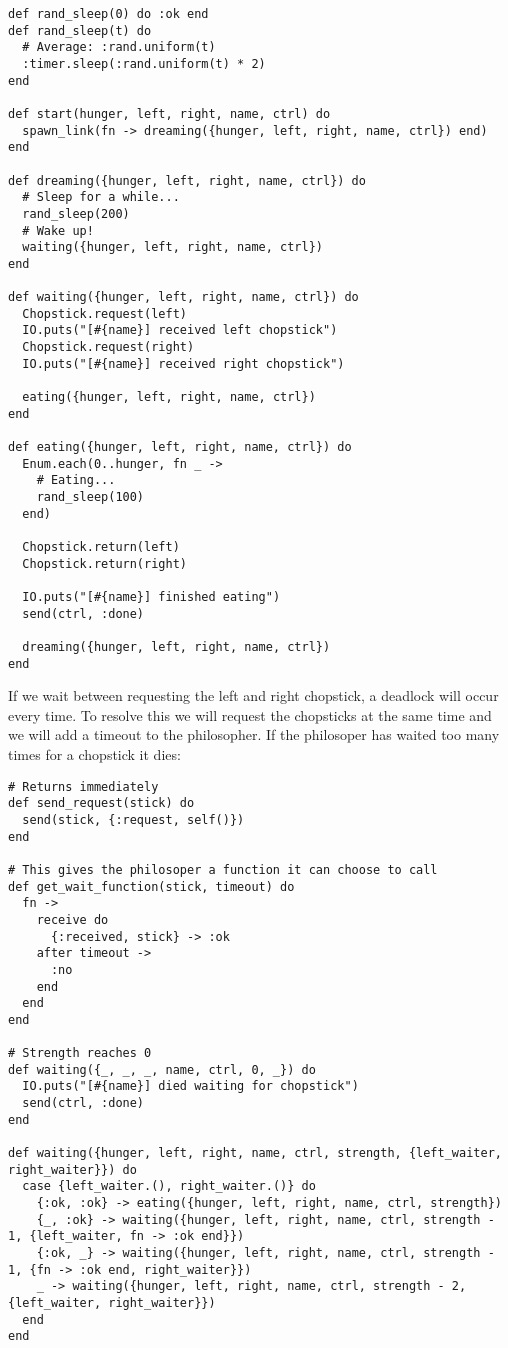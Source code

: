 \documentclass[a4paper,11pt]{article}
\begin{document}
\begin{verbatim}
def rand_sleep(0) do :ok end
def rand_sleep(t) do
  # Average: :rand.uniform(t)
  :timer.sleep(:rand.uniform(t) * 2)
end

def start(hunger, left, right, name, ctrl) do
  spawn_link(fn -> dreaming({hunger, left, right, name, ctrl}) end)
end

def dreaming({hunger, left, right, name, ctrl}) do
  # Sleep for a while...
  rand_sleep(200)
  # Wake up!
  waiting({hunger, left, right, name, ctrl})
end

def waiting({hunger, left, right, name, ctrl}) do
  Chopstick.request(left)
  IO.puts("[#{name}] received left chopstick")
  Chopstick.request(right)
  IO.puts("[#{name}] received right chopstick")

  eating({hunger, left, right, name, ctrl})
end

def eating({hunger, left, right, name, ctrl}) do
  Enum.each(0..hunger, fn _ ->
    # Eating...
    rand_sleep(100)
  end)

  Chopstick.return(left)
  Chopstick.return(right)

  IO.puts("[#{name}] finished eating")
  send(ctrl, :done)

  dreaming({hunger, left, right, name, ctrl})
end
\end{verbatim}

If we wait between requesting the left and right chopstick, a deadlock will occur every time.
To resolve this we will request the chopsticks at the same time and we will add a timeout to the philosopher. If the philosoper has waited too many times for a chopstick it dies:

\begin{verbatim}
# Returns immediately
def send_request(stick) do
  send(stick, {:request, self()})
end

# This gives the philosoper a function it can choose to call
def get_wait_function(stick, timeout) do
  fn ->
    receive do
      {:received, stick} -> :ok
    after timeout ->
      :no
    end
  end
end

# Strength reaches 0
def waiting({_, _, _, name, ctrl, 0, _}) do
  IO.puts("[#{name}] died waiting for chopstick")
  send(ctrl, :done)
end

def waiting({hunger, left, right, name, ctrl, strength, {left_waiter, right_waiter}}) do
  case {left_waiter.(), right_waiter.()} do
    {:ok, :ok} -> eating({hunger, left, right, name, ctrl, strength})
    {_, :ok} -> waiting({hunger, left, right, name, ctrl, strength - 1, {left_waiter, fn -> :ok end}})
    {:ok, _} -> waiting({hunger, left, right, name, ctrl, strength - 1, {fn -> :ok end, right_waiter}})
    _ -> waiting({hunger, left, right, name, ctrl, strength - 2, {left_waiter, right_waiter}})
  end
end
\end{verbatim}
\end{document}
